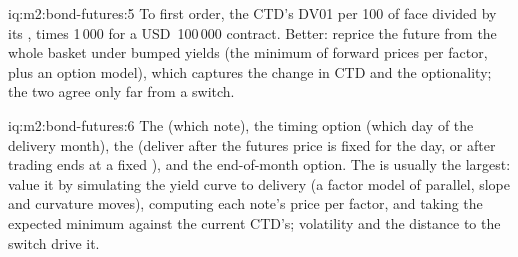 \begin{solution}{iq:m2:bond-futures:5}
To first order, the CTD's DV01 per 100 of face divided by its , times 1\,000 for a USD~100\,000 contract. Better: reprice the future
from the whole basket under bumped yields (the minimum of forward prices per
factor, plus an option model), which captures the change in CTD and the
optionality; the two agree only far from a switch.
\end{solution}

\begin{solution}{iq:m2:bond-futures:6}
The  (which note), the timing option (which day of the delivery
month), the  (deliver after the futures price is fixed for the
day, or after trading ends at a fixed ), and the end-of-month
option. The  is usually the largest: value it by simulating the
yield curve to delivery (a factor model of parallel, slope and curvature moves),
computing each note's price per factor, and taking the expected minimum
against the current CTD's; volatility and the distance to the switch drive it.
\end{solution}
